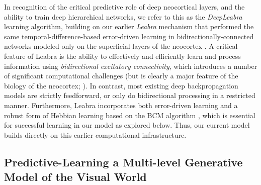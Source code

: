 \documentclass[11pt,twoside]{article}
\newif\myifpdf
\begin{document}
In recognition of the critical predictive role of deep neocortical layers, and the ability to train deep hierarchical networks, we refer to this as the {\em DeepLeabra} learning algorithm, building on our earlier {\em Leabra} mechanism that performed the same temporal-difference-based error-driven learning in bidirectionally-connected networks modeled only on the superficial layers of the neocortex \cite{OReillyHazyHerd15,OReillyMunakataFrankEtAl12,OReillyMunakata00,OReilly96}.
A critical feature of Leabra is the ability to effectively and efficiently learn and process information using {\em bidirectional excitatory connectivity}, which introduces a number of significant computational challenges (but is clearly a major feature of the biology of the neocortex; ). In contrast, most existing deep backpropagation models are strictly feedforward, or only do bidirectional processing in a restricted manner.  Furthermore, Leabra incorporates both error-driven learning and a robust form of Hebbian learning based on the BCM algorithm \cite{BienenstockCooperMunro82,CooperIntratorBlaisEtAl04,ShouvalWangWittenberg10}, which is essential for successful learning in our model as explored below.  Thus, our current model builds directly on this earlier computational infrastructure.


\subsection{Predictive-Learning a Multi-level Generative Model of the Visual World}
\end{document}
